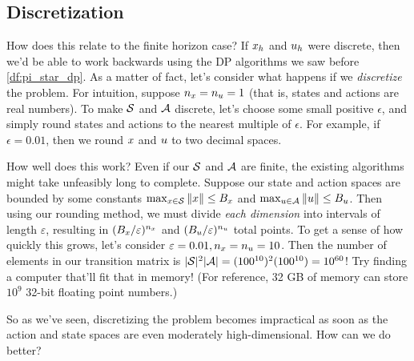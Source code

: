 \documentclass[\main/main]{subfiles}
\begin{document}

\subsection{Discretization}

How does this relate to the finite horizon case?
If $\st_\hi$ and $\act_\hi$ were discrete, then we'd be able to work backwards using
the DP algorithms we saw before \eqref{df:pi_star_dp}.
As a matter of fact, let's consider what happens if we \emph{discretize} the
problem. For intuition, suppose $n_\st = n_\act = 1$ (that is, states and actions are real numbers).
To make $\S$ and $\A$ discrete, let's choose some small positive $\epsilon$,
and simply round states and actions to the nearest multiple of
$\epsilon$. For example, if $\epsilon = 0.01$, then we round $\st$ and $\act$ to two decimal spaces.

How well does this work? Even if our $\S$ and $\A$ are
finite, the existing algorithms might take unfeasibly long to complete.
Suppose our state and action spaces
are bounded by some constants $\max_{\st \in \S} \|\st\| \le B_\st$ and
$\max_{\act \in \A} \|\act\| \le B_\act$.
Then using our rounding method, we must divide \emph{each dimension} into intervals of length $\varepsilon$,
resulting in $(B_\st/\varepsilon)^{n_\st}$ and $(B_\act/\varepsilon)^{n_\act}$ total points.
To get a sense of how quickly this grows, let's consider $\varepsilon = 0.01, n_\st = n_\act = 10$. Then the number of elements in our transition matrix is $|\S|^2 |\A| = (100^{10})^2 (100^{10}) = 10^{60}$!
Try finding a computer that'll fit that in memory! (For reference, 32 GB of memory can store $10^9$ 32-bit floating point numbers.)

So as we've seen, discretizing the problem becomes impractical as soon as
the action and state spaces are even moderately high-dimensional.
How can we do better?
\end{document}
